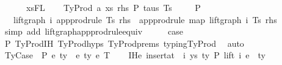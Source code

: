\begin{isabellebody}
\ \ \ \ \ \ xs{\isacharunderscore}{\kern0pt}FL{\isacharparenright}{\kern0pt}\isanewline
{}\isamarkupfalse%
\isanewline
\ \ \isamarkupfalse%
\ {\isacharparenleft}{\kern0pt}TyProd\ a\ xs\ rhs\ P\ taus\ Ts\ {\isasymGamma}{\isacharparenright}{\kern0pt}\isanewline
\isanewline
\ \ \isamarkupfalse%
\ P{}{\isacharcolon}{\kern0pt}\isanewline
\ \ \ {\isachardoublequoteopen}lift{\isacharunderscore}{\kern0pt}graph\ i\ {\isacharparenleft}{\kern0pt}app{\isacharunderscore}{\kern0pt}prodrule\ Ts\ rhs{\isacharparenright}{\kern0pt}\ {\isacharequal}{\kern0pt}\ app{\isacharunderscore}{\kern0pt}prodrule\ {\isacharparenleft}{\kern0pt}map\ {\isacharparenleft}{\kern0pt}lift{\isacharunderscore}{\kern0pt}graph\ i{\isacharparenright}{\kern0pt}\ Ts{\isacharparenright}{\kern0pt}\ rhs{\isachardoublequoteclose}\isanewline
\ \ \ \ \isamarkupfalse%
\ {\isacharparenleft}{\kern0pt}simp\ add{\isacharcolon}{\kern0pt}\ lift{\isacharunderscore}{\kern0pt}graph{\isacharunderscore}{\kern0pt}app{\isacharunderscore}{\kern0pt}prodrule{\isacharunderscore}{\kern0pt}equiv{\isacharparenright}{\kern0pt}\isanewline
\isanewline
\ \ \isamarkupfalse%
\ \isamarkupfalse%
\ {\isacharquery}{\kern0pt}case\isanewline
\ \ \ \ \isamarkupfalse%
\ P{}\ TyProd{\isachardot}{\kern0pt}IH\ TyProd{\isachardot}{\kern0pt}hyps{\isacharparenleft}{\kern0pt}{}{\isacharcomma}{\kern0pt}{}{\isacharcomma}{\kern0pt}{}{\isacharcomma}{\kern0pt}{}{\isacharparenright}{\kern0pt}\ TyProd{\isachardot}{\kern0pt}prems\ typing{\isachardot}{\kern0pt}TyProd\ \isamarkupfalse%
\ auto\isanewline
{}\isamarkupfalse%
\isanewline
\ \ \isamarkupfalse%
\ {\isacharparenleft}{\kern0pt}TyCase\ {\isasymGamma}\ P\ e{}\ ty{}\ {\isasymGamma}{}\ e{}\ ty{}{\isacharprime}{\kern0pt}\ e{}\ T{\isacharparenright}{\kern0pt}\isanewline
\ \ \isamarkupfalse%
\ IHe{}{\isacharcolon}{\kern0pt}\ {\isachardoublequoteopen}insert{\isacharunderscore}{\kern0pt}at\ {\isasymGamma}\ i\ {\isacharparenleft}{\kern0pt}ys{\isacharcomma}{\kern0pt}\ ty{}{\isacharparenright}{\kern0pt}\ {\isasymturnstile}{\isacharbraceleft}{\kern0pt}P{\isacharbraceright}{\kern0pt}\ lift\ i\ e{}\ {\isacharcolon}{\kern0pt}\ ty{}{\isachardoublequoteclose}\isanewline
\ \ \ \ \isamarkupfalse%

\end{isabellebody}
